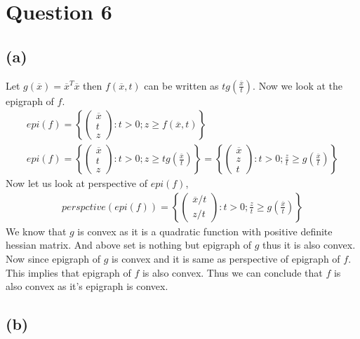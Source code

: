 \documentclass{article}
\begin{document}
\section*{\hfil Question 6}
\subsection*{(a)}
Let $g(\overline{x}) = \overline{x}^T\overline{x}$ then $f(\overline{x}, t)$ can be written as $tg(\frac{\overline{x}}{t})$. Now we look at the epigraph of $f$.
\begin{gather*}
	epi(f) = \left\{\begin{pmatrix}
	\overline{x}\\
	t\\
	z
	\end{pmatrix} : t > 0; z \ge f(\overline{x}, t)\right\}\\
	epi(f) = \left\{\begin{pmatrix}
	\overline{x}\\
	t\\
	z
	\end{pmatrix} : t > 0; z \ge tg\left(\frac{\overline{x}}{t}\right)\right\} = \left\{\begin{pmatrix}
	\overline{x}\\
	z\\
	t
	\end{pmatrix} : t > 0; \frac{z}{t} \ge g\left(\frac{\overline{x}}{t}\right)\right\}
\end{gather*}
Now let us look at perspective of $epi(f)$,
\begin{gather*}
perspctive(epi(f)) = \left\{\begin{pmatrix}
	\overline{x}/t\\
	z/t
	\end{pmatrix} : t > 0; \frac{z}{t} \ge g\left(\frac{\overline{x}}{t}\right)\right\}
\end{gather*}
We know that $g$ is convex as it is a quadratic function with positive definite hessian matrix. And above set is nothing but epigraph of $g$ thus it is also convex. Now since epigraph of $g$ is convex and it is same as perspective of epigraph of $f$. This implies that epigraph of $f$ is also convex. Thus we can conclude that $f$ is also convex as it's epigraph is convex.
\subsection*{(b)}
\end{document}
